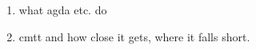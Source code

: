 \begin{enumerate}
\item what agda etc. do
\item cmtt and how close it gets, where it falls short.
\end{enumerate}
